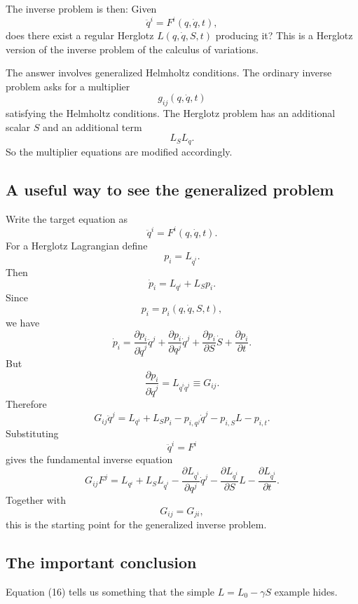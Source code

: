The inverse problem is then:
Given $$ \ddot q^i=F^i(q,\dot q,t), $$
does there exist a regular Herglotz \(L(q,\dot q,S,t)\) producing it?
This is a Herglotz version of the inverse problem of the calculus of variations.

The answer involves generalized Helmholtz conditions.
The ordinary inverse problem asks for a multiplier
$$ g_{ij}(q,\dot q,t) $$
satisfying the Helmholtz conditions.
The Herglotz problem has an additional scalar \(S\) and an additional term
$$ L_S L_{\dot q}. $$
So the multiplier equations are modified accordingly.
\subsection{A useful way to see the generalized problem}
Write the target equation as
\begin{equation}
 \boxed{ \ddot q^i=F^i(q,\dot q,t). } \tag{13} 
\end{equation}
For a Herglotz Lagrangian define
$$ p_i=L_{\dot q^i}. $$
Then
\begin{equation}
 \dot p_i=L_{q^i}+L_Sp_i. \tag{14} 
\end{equation}
Since
$$ p_i=p_i(q,\dot q,S,t), $$
we have
$$ \dot p_i = \frac{\partial p_i}{\partial\dot q^j}\ddot q^j + \frac{\partial p_i}{\partial q^j}\dot q^j + \frac{\partial p_i}{\partial S}\dot S + \frac{\partial p_i}{\partial t}. $$
But
$$ \frac{\partial p_i}{\partial\dot q^j} = L_{\dot q^i\dot q^j} \equiv G_{ij}. $$
Therefore
\begin{equation}
 \boxed{ G_{ij}\ddot q^j = L_{q^i} +L_Sp_i - p_{i,q^j}\dot q^j - p_{i,S}L - p_{i,t}. } \tag{15} 
\end{equation}
Substituting
$$ \ddot q^i=F^i $$
gives the fundamental inverse equation
\begin{equation}
 \boxed{ G_{ij}F^j = L_{q^i} +L_SL_{\dot q^i} - \frac{\partial L_{\dot q^i}}{\partial q^j}\dot q^j - \frac{\partial L_{\dot q^i}}{\partial S}L - \frac{\partial L_{\dot q^i}}{\partial t}. } \tag{16} 
\end{equation}
Together with $$ G_{ij}=G_{ji}, $$
this is the starting point for the generalized inverse problem.

\subsection{The important conclusion}

Equation (16) tells us something that the simple \(L=L_0-\gamma S\) example hides.


